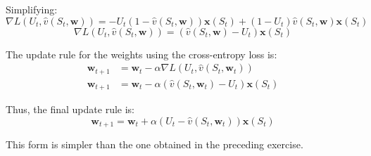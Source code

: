 Simplifying:
\[ 
    \nabla L(U_t, \hat{v}(S_t, \mathbf{w})) = - U_t (1 - \hat{v}(S_t, \mathbf{w})) \mathbf{x}(S_t) + (1 - U_t) \hat{v}(S_t, \mathbf{w}) \mathbf{x}(S_t)
\]
\[ 
    \nabla L(U_t, \hat{v}(S_t, \mathbf{w})) = (\hat{v}(S_t, \mathbf{w}) - U_t) \mathbf{x}(S_t)
\]

The update rule for the weights using the cross-entropy loss is:
\begin{align*}
    \mathbf{w}_{t+1} &= \mathbf{w}_t - \alpha \nabla L(U_t, \hat{v}(S_t, \mathbf{w}_t)) \\
    \mathbf{w}_{t+1} &= \mathbf{w}_t - \alpha (\hat{v}(S_t, \mathbf{w}_t) - U_t) \mathbf{x}(S_t)
\end{align*}

Thus, the final update rule is:
\[ 
    \mathbf{w}_{t+1} = \mathbf{w}_t + \alpha (U_t - \hat{v}(S_t, \mathbf{w}_t)) \mathbf{x}(S_t)
\]

This form is simpler than the one obtained in the preceding exercise.
